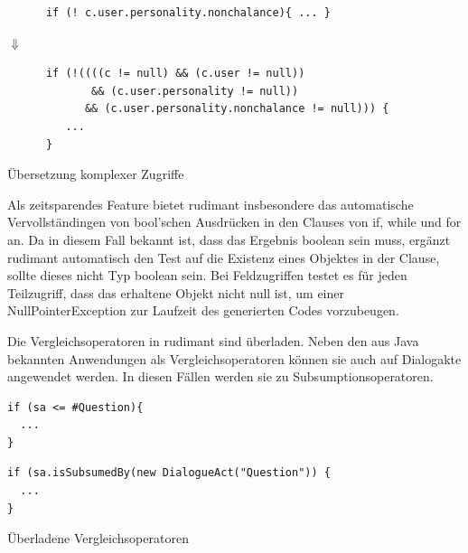 \begin{table}[htbp]
  \centering
  \begin{small}
    \begin{BVerbatim}
      if (! c.user.personality.nonchalance){ ... }
    \end{BVerbatim}

    {\Large$\Downarrow$}\\

    \begin{BVerbatim}
      if (!((((c != null) && (c.user != null))
             && (c.user.personality != null))
            && (c.user.personality.nonchalance != null))) {
         ...
      }
\end{BVerbatim}
\end{small}

\caption{Übersetzung komplexer Zugriffe}
\label{tab:multi-predaccess}
\end{table}
\vspace*{10pt}

Als zeitsparendes Feature bietet rudimant insbesondere das automatische
Vervollständingen von bool'schen Ausdrücken in den Clauses von if, while und
for an. Da in diesem Fall bekannt ist, dass das Ergebnis boolean sein muss,
ergänzt rudimant automatisch den Test auf die Existenz eines Objektes in der
Clause, sollte dieses nicht Typ boolean sein. Bei Feldzugriffen testet es für
jeden Teilzugriff, dass das erhaltene Objekt nicht null ist, um einer
NullPointerException zur Laufzeit des generierten Codes vorzubeugen.

Die Vergleichsoperatoren in rudimant sind überladen. Neben den aus Java bekannten Anwendungen als Vergleichsoperatoren können sie auch auf Dialogakte angewendet werden. In diesen Fällen werden sie zu Subsumptionsoperatoren.

\begin{table}[htbp]
  \centering
  \begin{footnotesize}
    \begin{minipage}{0.3\textwidth}
\begin{verbatim}
if (sa <= #Question){
  ...
}
\end{verbatim}
    \end{minipage}
    \begin{minipage}{0.5\textwidth}
\begin{verbatim}
if (sa.isSubsumedBy(new DialogueAct("Question")) {
  ...
}
\end{verbatim}
    \end{minipage}
  \end{footnotesize}

  \caption{Überladene Vergleichsoperatoren}
  \label{tab:overloaded-comparison}
\end{table}

